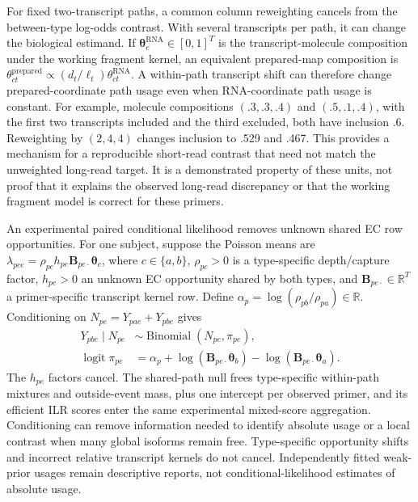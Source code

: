 \documentclass[11pt]{article}
\begin{document}
For fixed two-transcript paths, a common column reweighting cancels from the between-type log-odds contrast. With several transcripts per path, it can change the biological estimand. If \(\boldsymbol\theta_c^{\mathrm{RNA}}\in[0,1]^T\) is the transcript-molecule composition under the working fragment kernel, an equivalent prepared-map composition is \(\theta_{ct}^{\mathrm{prepared}}\propto(d_t/\ell_t)\theta_{ct}^{\mathrm{RNA}}\). A within-path transcript shift can therefore change prepared-coordinate path usage even when RNA-coordinate path usage is constant. For example, molecule compositions \((.3,.3,.4)\) and \((.5,.1,.4)\), with the first two transcripts included and the third excluded, both have inclusion .6. Reweighting by \((2,4,4)\) changes inclusion to .529 and .467. This provides a mechanism for a reproducible short-read contrast that need not match the unweighted long-read target. It is a demonstrated property of these units, not proof that it explains the observed long-read discrepancy or that the working fragment model is correct for these primers.

An experimental paired conditional likelihood removes unknown shared EC row opportunities. For one subject, suppose the Poisson means are \(\lambda_{pce}=\rho_{pc}h_{pe}\mathbf B_{pe\cdot}\boldsymbol\theta_c\), where \(c\in\{a,b\}\), \(\rho_{pc}>0\) is a type-specific depth/capture factor, \(h_{pe}>0\) an unknown EC opportunity shared by both types, and \(\mathbf B_{pe\cdot}\in\mathbb R^T\) a primer-specific transcript kernel row. Define \(\alpha_p=\log(\rho_{pb}/\rho_{pa})\in\mathbb R\). Conditioning on \(N_{pe}=Y_{pae}+Y_{pbe}\) gives \begin{equation}\begin{aligned}Y_{pbe}\mid N_{pe}&\sim\operatorname{Binomial}(N_{pe},\pi_{pe}),\\\operatorname{logit}\pi_{pe}&=\alpha_p+\log(\mathbf B_{pe\cdot}\boldsymbol\theta_b)-\log(\mathbf B_{pe\cdot}\boldsymbol\theta_a).\end{aligned}\end{equation} The \(h_{pe}\) factors cancel. The shared-path null frees type-specific within-path mixtures and outside-event mass, plus one intercept per observed primer, and its efficient ILR scores enter the same experimental mixed-score aggregation. Conditioning can remove information needed to identify absolute usage or a local contrast when many global isoforms remain free. Type-specific opportunity shifts and incorrect relative transcript kernels do not cancel. Independently fitted weak-prior usages remain descriptive reports, not conditional-likelihood estimates of absolute usage.
\end{document}
